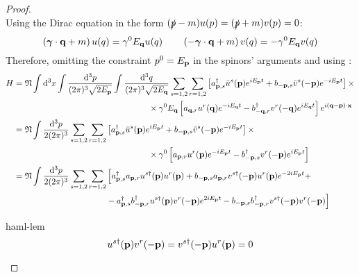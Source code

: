 \begin{proofbox}
\begin{proof}
\begin{equation*}
    \end{equation*}
    Using the Dirac equation in the form $ (\slashed{p} - m) u(p) = (\slashed{p} + m) v(p) = 0 $:
    \begin{equation*}
      \left( \boldsymbol{\gamma} \cdot \mathbf{q} + m \right) u(q) = \gamma^0 E_{\mathbf{q}} u(q)
      \qquad
      \left( -\boldsymbol{\gamma} \cdot \mathbf{q} + m \right) v(q) = - \gamma^0 E_{\mathbf{q}} v(q)
    \end{equation*}
    Therefore, omitting the constraint $ p^0 = E_{\mathbf{p}} $ in the spinors' arguments and using :
    \begin{equation*}
      \begin{split}
        H
        &= \mathfrak{N} \int \mathrm{d}^3x \int \frac{\mathrm{d}^3p}{(2\pi)^3 \sqrt{2E_{\mathbf{p}}}} \int \frac{\mathrm{d}^3q}{(2\pi)^3 \sqrt{2E_{\mathbf{q}}}} \sum_{s = 1,2} \sum_{r = 1,2} \left[ a_{\mathbf{p},s}^\dagger \bar{u}^s(\mathbf{p}) e^{i E_{\mathbf{p}} t} + b_{-\mathbf{p},s} \bar{v}^s(-\mathbf{p}) e^{-i E_{\mathbf{p}} t} \right] \times \\
        & \qquad \qquad \qquad \qquad \qquad \qquad \qquad \qquad \times \gamma^0 E_{\mathbf{q}} \left[ a_{\mathbf{q},r} u^r(\mathbf{q}) e^{-i E_{\mathbf{q}} t} - b_{-\mathbf{q},r}^\dagger v^r(-\mathbf{q}) e^{i E_{\mathbf{q}} t} \right] e^{i (\mathbf{q} - \mathbf{p}) \cdot \mathbf{x}} \\
        &= \mathfrak{N} \int \frac{\mathrm{d}^3p}{2(2\pi)^3} \sum_{s = 1,2} \sum_{r = 1,2} \left[ a_{\mathbf{p},s}^\dagger \bar{u}^s(\mathbf{p}) e^{i E_{\mathbf{p}} t} + b_{-\mathbf{p},s} \bar{v}^s(-\mathbf{p}) e^{-i E_{\mathbf{p}} t} \right] \times \\
        & \qquad \qquad \qquad \qquad \qquad \qquad \qquad \qquad \times \gamma^0 \left[ a_{\mathbf{p},r} u^r(\mathbf{p}) e^{-i E_{\mathbf{p}} t} - b_{-\mathbf{p},s}^\dagger v^r(-\mathbf{p}) e^{i E_{\mathbf{p}} t} \right] \\
        &= \mathfrak{N} \int \frac{\mathrm{d}^3p}{2(2\pi)^3} \sum_{s = 1,2} \sum_{r = 1,2} \Big[ a_{\mathbf{p},s}^\dagger a_{\mathbf{p},r} u^{s\dagger}(\mathbf{p}) u^r(\mathbf{p}) + b_{-\mathbf{p},s} a_{\mathbf{p},r} v^{s\dagger}(-\mathbf{p}) u^r(\mathbf{p}) e^{-2i E_{\mathbf{p}} t} + \\
        & \qquad \qquad \qquad \qquad \qquad \quad - a_{\mathbf{p},s}^\dagger b_{-\mathbf{p},r}^\dagger u^{s\dagger}(\mathbf{p}) v^r(-\mathbf{p}) e^{2i E_{\mathbf{p}} t} - b_{-\mathbf{p},s} b_{-\mathbf{p},r}^\dagger v^{s\dagger}(-\mathbf{p}) v^r(-\mathbf{p}) \Big]
      \end{split}
    \end{equation*}

    \begin{lemma}[before upper = {\tcbtitle}, borderline = {1pt}{0pt}{blue!35!black}]{}{haml-lem}
      \begin{equation*}
        u^{s\dagger}(\mathbf{p}) v^r(-\mathbf{p}) = v^{s\dagger}(-\mathbf{p}) u^r(\mathbf{p}) = 0
      \end{equation*}
    \end{lemma}


\end{proof}
\end{proofbox}
